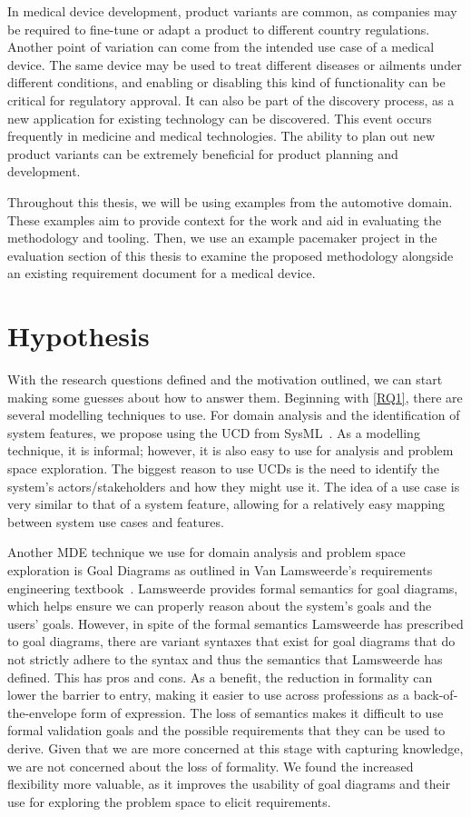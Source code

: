 In medical device development, product variants are common, as companies may be required to fine-tune or adapt a product to different country regulations. Another point of variation can come from the intended use case of a medical device. The same device may be used to treat different diseases or ailments under different conditions, and enabling or disabling this kind of functionality can be critical for regulatory approval. It can also be part of the discovery process, as a new application for existing technology can be discovered. This event occurs frequently in medicine and medical technologies. The ability to plan out new product variants can be extremely beneficial for product planning and development.

Throughout this thesis, we will be using examples from the automotive domain. These examples aim to provide context for the work and aid in evaluating the methodology and tooling. Then, we use an example pacemaker project in the evaluation section of this thesis to examine the proposed methodology alongside an existing requirement document for a medical device.

\section{Hypothesis}

With the research questions defined and the motivation outlined, we can start making some guesses about how to answer them. Beginning with \ref{RQ1}, there are several modelling techniques to use. For domain analysis and the identification of system features, we propose using the \gls{UCD} from SysML~\cite{sysml2019omg}. As a modelling technique, it is informal; however, it is also easy to use for analysis and problem space exploration. The biggest reason to use \gls{UCD}s is the need to identify the system's actors/stakeholders and how they might use it. The idea of a use case is very similar to that of a system feature, allowing for a relatively easy mapping between system use cases and features.

Another \gls{MDE} technique we use for domain analysis and problem space exploration is Goal Diagrams as outlined in Van Lamsweerde's requirements engineering textbook~\cite{lamsweerde2009requirements}. Lamsweerde provides formal semantics for goal diagrams, which helps ensure we can properly reason about the system's goals and the users' goals. However, in spite of the formal semantics Lamsweerde has prescribed to goal diagrams, there are variant syntaxes that exist for goal diagrams that do not strictly adhere to the syntax and thus the semantics that Lamsweerde has defined. This has pros and cons. As a benefit, the reduction in formality can lower the barrier to entry, making it easier to use across professions as a back-of-the-envelope form of expression. The loss of semantics makes it difficult to use formal validation goals and the possible requirements that they can be used to derive. Given that we are more concerned at this stage with capturing knowledge, we are not concerned about the loss of formality. We found the increased flexibility more valuable, as it improves the usability of goal diagrams and their use for exploring the problem space to elicit requirements.

